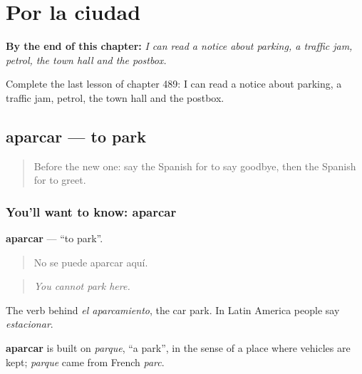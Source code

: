 
\chapter{Por la ciudad}
\label{ch:es-por-la-ciudad}

\begin{chapteropening}
\textbf{By the end of this chapter:} \emph{I can read a notice about parking, a traffic jam, petrol, the town hall and the postbox.}

Complete the last lesson of chapter 489: I can read a notice about parking, a traffic jam, petrol, the town hall and the postbox.
\end{chapteropening}

\section[aparcar]{aparcar — to park}

\label{lesson:ES-C489-aparcar}



\begin{quote}
Before the new one: say the Spanish for to say goodbye, then the Spanish for to greet.
\end{quote}

\subsection*{You'll want to know: aparcar}
\textbf{aparcar} — \textquotedblleft{}to park\textquotedblright{}.

\begin{quote}
No se puede aparcar aquí.
\end{quote}

\begin{quote}
\emph{You cannot park here.}
\end{quote}

The verb behind \emph{el aparcamiento}, the car park. In Latin America people say \emph{estacionar}.

\begin{cousinweb}
\textbf{aparcar} is built on \emph{parque}, \textquotedblleft{}a park\textquotedblright{}, in the sense of a place where vehicles are kept; \emph{parque} came from French \emph{parc}.
\end{cousinweb}


